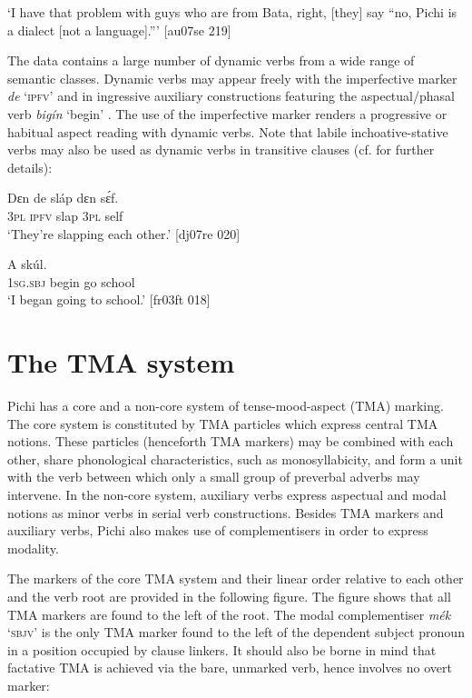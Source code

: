 \glt ‘I have that problem with guys who are from Bata, right, [they] say 
“no, Pichi is a dialect [not a language].”’ [au07se 219]
\z

The data contains a large number of dynamic verbs from a wide range of semantic classes. Dynamic verbs may appear freely with the imperfective marker \textit{de} ‘\textsc{ipfv’}  and in ingressive auxiliary constructions featuring the aspectual/phasal verb \textit{bigín} ‘begin’ . The use of the imperfective marker renders a progressive or habitual aspect reading with dynamic verbs. Note that labile inchoative-stative verbs may also be used as dynamic verbs in transitive clauses (cf.  for further details):


\ea%
    \label{ex:key:312}
    \gll Dɛn  de  sláp  dɛn  sɛ́f.\\
\textsc{3pl}  \textsc{ipfv}  slap  \textsc{3pl}  self\\

\glt ‘They’re slapping each other.’ [dj07re 020]
\z


\ea%
    \label{ex:key:313}
    \gll \MakeUppercase{A}       skúl.\\
\textsc{1sg.sbj}  begin  go  school\\

\glt ‘I began going to school.’ [fr03ft 018]
\z

\section{The TMA system}\label{sec:6.2}

Pichi has a core and a non-core system of tense-mood-aspect (TMA) marking. The core system is constituted by TMA particles which express central TMA notions. These particles (henceforth TMA markers) may be combined with each other, share phonological characteristics, such as monosyllabicity, and form a unit with the verb between which only a small group of preverbal adverbs may intervene. In the non-core system, auxiliary verbs express aspectual and modal notions as minor verbs in serial verb constructions. Besides TMA markers and auxiliary verbs, Pichi also makes use of complementisers in order to express modality. 


The markers of the core TMA system and their linear order relative to each other and the verb root are provided in the following figure. The figure shows that all TMA markers are found to the left of the root. The modal complementiser \textit{mék} ‘\textsc{sbjv}’ is the only TMA marker found to the left of the dependent subject pronoun in a position occupied by clause linkers. It should also be borne in mind that factative TMA is achieved via the bare, unmarked verb, hence involves no overt marker: 


